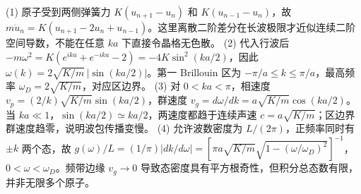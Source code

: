 (1) 原子受到两侧弹簧力 \(K(u_{n+1}-u_n)\) 和 \(K(u_{n-1}-u_n)\)，故 \(m\ddot u_n=K(u_{n+1}-2u_n+u_{n-1})\)。这里离散二阶差分在长波极限才近似连续二阶空间导数，不能在任意 \(ka\) 下直接令晶格无色散。
(2) 代入行波后 \(-m\omega^2=K(e^{ika}+e^{-ika}-2)=-4K\sin^2(ka/2)\)，因此 \(\omega(k)=2\sqrt{K/m}\,|\sin(ka/2)|\)。第一 Brillouin 区为 \(-\pi/a\le k\le\pi/a\)，最高频率 \(\omega_D=2\sqrt{K/m}\)，对应区边界。
(3) 对 \(0<ka<\pi\)，相速度 \(v_p=(2/k)\sqrt{K/m}\sin(ka/2)\)，群速度 \(v_g=d\omega/dk=a\sqrt{K/m}\cos(ka/2)\)。当 \(ka\ll1\)，\(\sin(ka/2)\simeq ka/2\)，两速度都趋于连续声速 \(c=a\sqrt{K/m}\)；区边界群速度趋零，说明波包传播变慢。
(4) 允许波数密度为 \(L/(2\pi)\)，正频率同时有 \(\pm k\) 两个态，故 \(g(\omega)/L=(1/\pi)|dk/d\omega|=[\pi a\sqrt{K/m}\sqrt{1-(\omega/\omega_D)^2}]^{-1}\)，\(0<\omega<\omega_D\)。频带边缘 \(v_g\to0\) 导致态密度具有平方根奇性，但积分总态数有限，并非无限多个原子。
